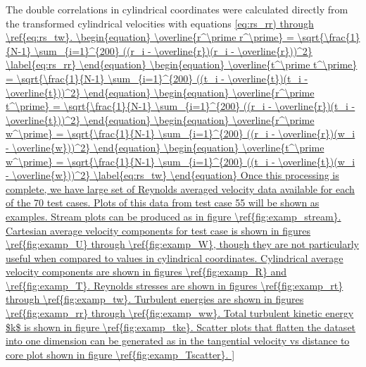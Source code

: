 The double correlations in cylindrical coordinates were calculated directly 
from the transformed cylindrical velocities with equations \ref{eq:rs_rr) 
through \ref{eq:rs_tw}.
	
\begin{equation}
\overline{r^\prime r^\prime} = \sqrt{\frac{1}{N-1} \sum_{i=1}^{200} 
	((r_i - \overline{r})(r_i - \overline{r}))^2}
\label{eq:rs_rr}
\end{equation}

\begin{equation}
\overline{t^\prime t^\prime} = \sqrt{\frac{1}{N-1} \sum_{i=1}^{200} 
	((t_i - \overline{t})(t_i - \overline{t}))^2}
\end{equation}

\begin{equation}
\overline{r^\prime t^\prime} = \sqrt{\frac{1}{N-1} \sum_{i=1}^{200} 
	((r_i - \overline{r})(t_i - \overline{t}))^2}
\end{equation}

\begin{equation}
\overline{r^\prime w^\prime} = \sqrt{\frac{1}{N-1} \sum_{i=1}^{200} 
	((r_i - \overline{r})(w_i - \overline{w}))^2}
\end{equation}

\begin{equation}
\overline{t^\prime w^\prime} = \sqrt{\frac{1}{N-1} \sum_{i=1}^{200} 
	((t_i - \overline{t})(w_i - \overline{w}))^2}
\label{eq:rs_tw}
\end{equation}

	
Once this processing is complete, we have large set of Reynolds averaged 
velocity data available for each of the 70 test cases. Plots of this data from 
test case 55 will be shown as examples. Stream plots can be produced as in 
figure \ref{fig:examp_stream}. Cartesian average velocity components for test 
case is shown in figures \ref{fig:examp_U} through \ref{fig:examp_W}, though 
they are not particularly useful when compared to values in cylindrical 
coordinates. 
Cylindrical average velocity components are shown in figures \ref{fig:examp_R} 
and \ref{fig:examp_T}. Reynolds stresses are shown in figures 
\ref{fig:examp_rt} through \ref{fig:examp_tw}. Turbulent energies are shown in 
figures \ref{fig:examp_rr} through \ref{fig:examp_ww}. Total turbulent kinetic 
energy $k$ is shown in figure \ref{fig:examp_tke}. Scatter plots that 
flatten the dataset into one dimension can be generated as in the tangential 
velocity vs distance to core plot shown in figure \ref{fig:examp_Tscatter}. 

}
